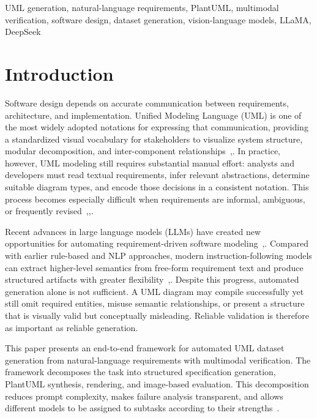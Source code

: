 \documentclass[conference]{IEEEtran}
\begin{document}
\begin{IEEEkeywords}
UML generation, natural-language requirements, PlantUML,
multimodal verification, software design, dataset generation,
vision-language models, LLaMA, DeepSeek
\end{IEEEkeywords}

\section{Introduction}

Software design depends on accurate communication between requirements,
architecture, and implementation. Unified Modeling Language (UML) is
one of the most widely adopted notations for expressing that
communication, providing a standardized visual vocabulary for
stakeholders to visualize system structure, modular decomposition, and
inter-component relationships~\cite{booch2005},\cite{ambler2004}. In practice,
however, UML modeling still requires substantial manual effort: analysts
and developers must read textual requirements, infer relevant
abstractions, determine suitable diagram types, and encode those
decisions in a consistent notation. This process becomes especially
difficult when requirements are informal, ambiguous, or frequently
revised~\cite{shinde2012},\cite{maatuk2021},\cite{abdelnabi2020}.

Recent advances in large language models (LLMs) have created new
opportunities for automating requirement-driven software
modeling~\cite{vaswani2017},\cite{brown2020}. Compared with earlier rule-based
and NLP approaches, modern instruction-following models can extract
higher-level semantics from free-form requirement text and produce
structured artifacts with greater flexibility~\cite{meng2024},\cite{yuan2025}.
Despite this progress, automated generation alone is not sufficient.
A UML diagram may compile successfully yet still omit required entities,
misuse semantic relationships, or present a structure that is visually
valid but conceptually misleading. Reliable validation is therefore
as important as reliable generation.

This paper presents an end-to-end framework for automated UML dataset
generation from natural-language requirements with multimodal
verification. The framework decomposes the task into structured
specification generation, PlantUML synthesis, rendering, and
image-based evaluation. This decomposition reduces prompt complexity,
makes failure analysis transparent, and allows different models to be
assigned to subtasks according to their strengths~\cite{wei2022}.
\end{document}
